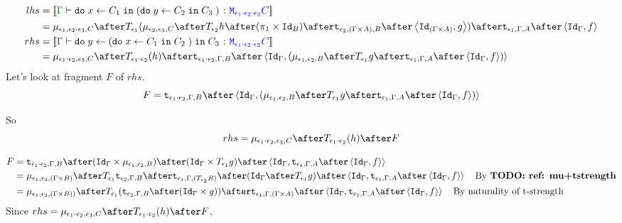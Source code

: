 {\begin{align}
    lhs & =  \deno{\gtyperelation{\doin{x}{C_1}{(\doin{y}{C_2}{C_3})}}{\M{\e_1\dot\e_2\dot\e_3}{C}}} \\
    & = \bind{\e_1}{\e_2\dot\e_3}{C}\after\T{
        \e_1}{(\bind{\e_2}{\e_3}{C}\after\T{\e_2}{h\after(\p \times \Id{B})}\after\tstrength{\e_2}{(\G\times A)}{B}\after\pr{\Id{(\G\times A)}}{g}
        )}\after\tstrength{\e_1}{\G}{A}\after\pr{\idg}{f}\\
        rhs &  = \deno{\gtyperelation{\doin{y}{(\doin{x}{C_1}{C_2})}{C_3}}{\M{\e_1\dot\e_2\dot\e_2}{C}}}  \\
    & = \bind{\e_1\dot\e_2}{\e_3}{C}\after\T{\e_1\dot\e_2}{(h)}\after\tstrength{\e_1\dot\e_2}{\G}{B}\after\pr{\idg}{(\bind{\e_1}{\e_2}{B}\after\T{\e_1}{g}\after\tstrength{\e_1}{\G}{A}\after\pr{\idg}{f})} \\
\end{align}
Let's look at fragment $F$ of $rhs$.
\begin{equation}
    F = \tstrength{\e_1\dot\e_2}{\G}{B}\after\pr{\idg}{(\bind{\e_1}{\e_2}{B}\after\T{\e_1}{g}\after\tstrength{\e_1}{\G}{A}\after\pr{\idg}{f})}
\end{equation}

So 
\begin{equation}
    rhs = \bind{\e_1\dot\e_2}{\e_3}{C}\after\T{\e_1\dot\e_2}{(h)}\after F
\end{equation}

\begin{equation}
    \begin{split}
        F & = \tstrength{\e_1\dot\e_2}{\G}{B}\after(\idg\times\bind{\e_1}{\e_2}{B})\after(\idg\times\T{\e_1}{g})\after\pr{\idg}{\tstrength{\e_1}{\G}{A}\after\pr{\idg}{f}}\\
        &  = \bind{\e_1}{\e_2}{(\G\times B)} \after \T{\e_1}{\tstrength{\e_2}{\G}{B}} \after\tstrength{\e_1}{\G}{(\T{\e_2}{B})} \after (\idg \after\T{\e_1}{g})\after\pr{\idg}{\tstrength{\e_1}{\G}{A}\after\pr{\idg}{f}}\qt{By \todo{ref: mu+tstrength}}
        \\ & = \bind{\e_1}{\e_2}{(\G \times B))} \after \T{\e_1}{(\tstrength{\e_2}{\G}{B} \after (\idg \times g))} \after \tstrength{\e_1}{\G}{(\G \times A)} \after \pr{\idg}{\tstrength{\e_1}{\G}{A}\after\pr{\idg}{f}}\qt{By naturality of t-strength}
    \end{split}
\end{equation}
Since
$
    rhs = \bind{\e_1\dot\e_2}{\e_3}{C}\after\T{\e_1\dot\e_2}{(h)}\after F
$, 

}
